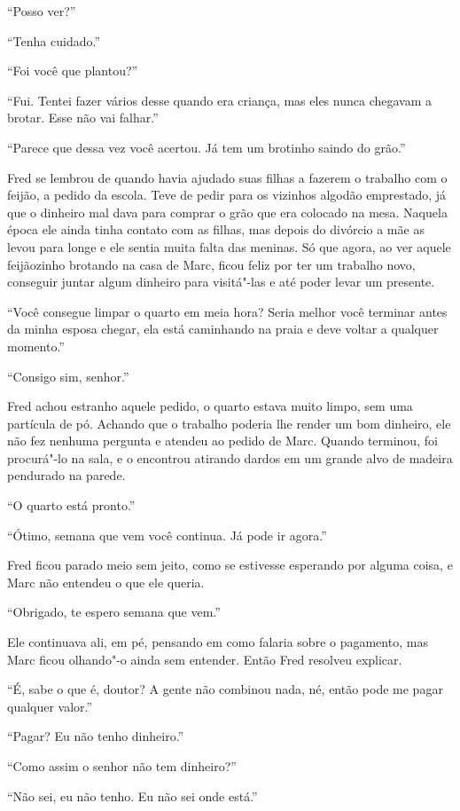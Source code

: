 ``Posso ver?''

``Tenha cuidado.''

``Foi você que plantou?''

``Fui. Tentei fazer vários desse quando era criança, mas eles nunca
chegavam a brotar. Esse não vai falhar.''

``Parece que dessa vez você acertou. Já tem um brotinho saindo do
grão.''

Fred se lembrou de quando havia ajudado suas filhas a fazerem o trabalho
com o feijão, a pedido da escola. Teve de pedir para os vizinhos algodão
emprestado, já que o dinheiro mal dava para comprar o grão que era
colocado na mesa. Naquela época ele ainda tinha contato com as filhas,
mas depois do divórcio a mãe as levou para longe e ele sentia muita
falta das meninas. Só que agora, ao ver aquele feijãozinho brotando na
casa de Marc, ficou feliz por ter um trabalho novo, conseguir juntar
algum dinheiro para visitá"-las e até poder levar um presente.

``Você consegue limpar o quarto em meia hora? Seria melhor você terminar
antes da minha esposa chegar, ela está caminhando na praia e deve voltar
a qualquer momento.''

``Consigo sim, senhor.''

Fred achou estranho aquele pedido, o quarto estava muito limpo, sem uma
partícula de pó. Achando que o trabalho poderia lhe render um bom
dinheiro, ele não fez nenhuma pergunta e atendeu ao pedido de Marc.
Quando terminou, foi procurá"-lo na sala, e o encontrou atirando dardos em
um grande alvo de madeira pendurado na parede.

``O quarto está pronto.''

``Ótimo, semana que vem você continua. Já pode ir agora.''

Fred ficou parado meio sem jeito, como se estivesse esperando por alguma
coisa, e Marc não entendeu o que ele queria.

``Obrigado, te espero semana que vem.''

Ele continuava ali, em pé, pensando em como falaria sobre o pagamento,
mas Marc ficou olhando"-o ainda sem entender. Então Fred resolveu
explicar.

``É, sabe o que é, doutor? A gente não combinou nada, né, então pode me
pagar qualquer valor.''

``Pagar? Eu não tenho dinheiro.''

``Como assim o senhor não tem dinheiro?''

``Não sei, eu não tenho. Eu não sei onde está.''


